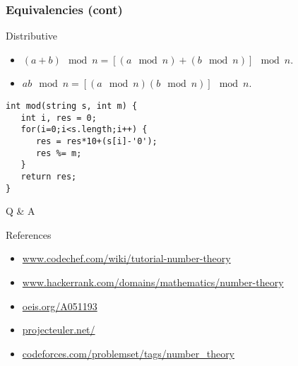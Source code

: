 \documentclass{beamer}
\begin{document}
\begin{frame}[fragile]
\frametitle{Equivalencies (cont)}
 \begin{block}{Distributive}
\begin{itemize}
\item $(a + b) \mod n = [(a \mod n) + (b \mod n)] \mod n$.
\item $ab \mod n = [(a \mod n)(b \mod n)] \mod n$.
\end{itemize}
\end{block}
 \begin{example}
\begin{lstlisting}
int mod(string s, int m) {
   int i, res = 0;
   for(i=0;i<s.length;i++) {
      res = res*10+(s[i]-'0');
      res %= m;
   }
   return res;
}
\end{lstlisting}
\end{example}
\end{frame}
\begin{frame}
\Huge{\centerline{ Q \& A }}

\normalsize
{
\begin{block}{References}
\begin{itemize}
\item \url{www.codechef.com/wiki/tutorial-number-theory}
\item \url{www.hackerrank.com/domains/mathematics/number-theory}
\item \url{oeis.org/A051193}
\item \url{projecteuler.net/}
\item \url{codeforces.com/problemset/tags/number_theory}
\end{itemize}
\end{block}
}
\end{frame}

\end{document}
